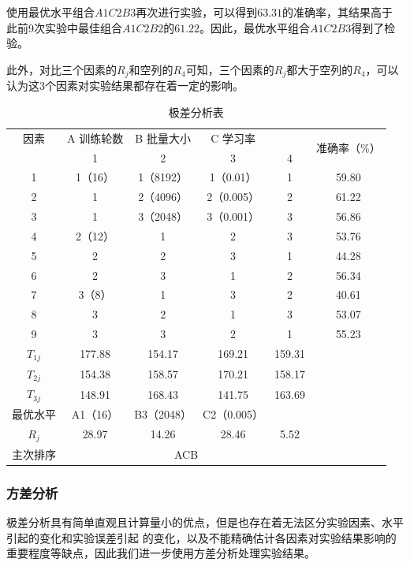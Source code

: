 \documentclass[UTF8]{ctexart}
\begin{document}
	使用最优水平组合$A1C2B3$再次进行实验，可以得到$63.31$的准确率，其结果高于此前9次实验中最佳组合$A1C2B2$的$61.22$。因此，最优水平组合$A1C2B3$得到了检验。
	
	此外，对比三个因素的$R_j$和空列的$R_4$可知，三个因素的$R_j$都大于空列的$R_4$，可以认为这3个因素对实验结果都存在着一定的影响。
		\begin{table}[htbp]
		\centering
		\caption{极差分析表}
		\begin{tabular}{|c|c|c|c|c|c|}
			\hline
			因素 & A 训练轮数 & B 批量大小 & C 学习率 &   & \multirow{2}[4]{*}{准确率（\%）} \\
			\cline{1-5} \diagbox{实验号}{列号} & 1 & 2 & 3 & 4 &  \\\hline
			1 & 1（16） & 1（8192） & 1（0.01） & 1 & 59.80 \\\hline
			2 & 1 & 2（4096） & 2（0.005） & 2 & 61.22 \\\hline
			3 & 1 & 3（2048） & 3（0.001） & 3 & 56.86 \\\hline
			4 & 2（12） & 1 & 2 & 3 & 53.76 \\\hline
			5 & 2 & 2 & 3 & 1 & 44.28 \\\hline
			6 & 2 & 3 & 1 & 2 & 56.34 \\\hline
			7 & 3（8） & 1 & 3 & 2 & 40.61 \\\hline
			8 & 3 & 2 & 1 & 3 & 53.07 \\\hline
			9 & 3 & 3 & 2 & 1 & 55.23 \\\hline
			$T_{1j}$ & 177.88 & 154.17 & 169.21 & 159.31 & \\\hline
			$T_{2j}$ & 154.38 & 158.57 & 170.21 & 158.17 & \\\hline
			$T_{3j}$ & 148.91 & 168.43 & 141.75 & 163.69 & \\\hline
			最优水平 & A1（16） & B3（2048） & C2（0.005）& & \\\hline
			$R_{j}$ & 28.97 & 14.26 & 28.46 & 5.52 & \\\hline
			主次排序 & \multicolumn{4}{c|}{ACB} & \\\hline
			
		\end{tabular}%
		\label{Chart.4}%
	\end{table}%
	
	\subsubsection{方差分析}
	极差分析具有简单直观且计算量小的优点，但是也存在着无法区分实验因素、水平引起的变化和实验误差引起
	的变化，以及不能精确估计各因素对实验结果影响的重要程度等缺点，因此我们进一步使用方差分析处理实验结果。
	
\end{document}
